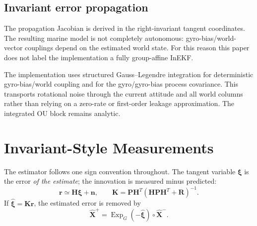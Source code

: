 \documentclass[conference]{IEEEtran}
\DeclareMathOperator{\Exp}{Exp}
\theoremstyle{bodysmall}
\begin{document}
\subsection{Invariant error propagation}
The propagation Jacobian is derived in the right-invariant tangent coordinates. The resulting marine model is not completely autonomous: gyro-bias/world-vector couplings depend on the estimated world state. For this reason this paper does not label the implementation a fully group-affine InEKF.

The implementation uses structured Gauss--Legendre integration for deterministic gyro-bias/world coupling and for the gyro/gyro-bias process covariance. This transports rotational noise through the current attitude and all world columns rather than relying on a zero-rate or first-order leakage approximation. The integrated OU block remains analytic.

\section{Invariant-Style Measurements}
The estimator follows one sign convention throughout. The tangent variable $\bm{\xi}$ is the error \emph{of the estimate}; the innovation is measured minus predicted:
\begin{equation}
\bm{r}\simeq \bm{H}\bm{\xi}+\bm{n},\qquad
\bm{K}=\bm{P}\bm{H}^T(\bm{H}\bm{P}\bm{H}^T+\bm{R})^{-1}.
\end{equation}
If $\hat{\bm{\xi}}=\bm{K}\bm{r}$, the estimated error is removed by
\begin{equation}
\hat {\bm{X}}^+=\Exp_G(-\hat{\bm{\xi}})\circ\hat {\bm{X}}^-.
\end{equation}
\end{document}

